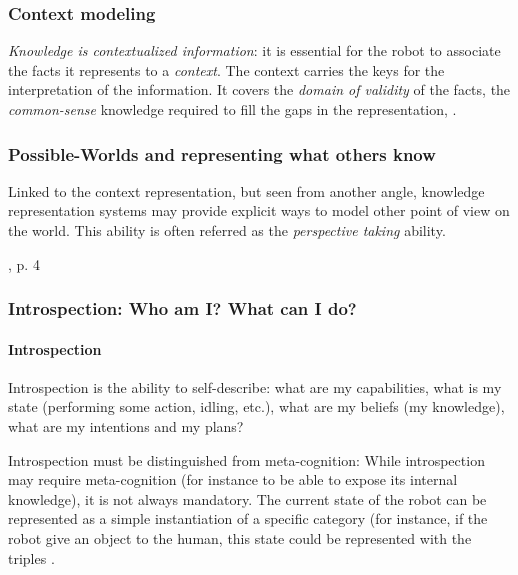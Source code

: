 
\subsubsection{Context modeling}

\emph{Knowledge is contextualized information}: it is essential for the robot to associate the facts it
represents to a \emph{context}. The context carries the keys for the
interpretation of the information. It covers the \emph{domain of validity} of
the facts, the \emph{common-sense} knowledge required to fill the gaps in the
representation, .

\subsubsection{Possible-Worlds and representing what others know}
\label{sect|possible-worlds}

    
Linked to the context representation, but seen from another angle, knowledge
representation systems may provide explicit ways to model other point of view
on the world. This ability is often referred as the \emph{perspective taking}
ability.

\cite{Levesque2008}, p. 4

\subsubsection{Introspection: Who am I? What can I do?}
\label{sect|introspection}

\paragraph{Introspection}

Introspection is the ability to self-describe: what are my capabilities, what
is my state (performing some action, idling, etc.), what are my beliefs (\ie my
knowledge), what are my intentions and my plans?

Introspection must be distinguished from meta-cognition: While introspection
may require meta-cognition (for instance to be able to expose its internal
knowledge), it is not always mandatory. The current state of the robot can be
represented as a simple instantiation of a specific category (for instance, if
the robot give an object to the human, this state could be represented with the
triples .

